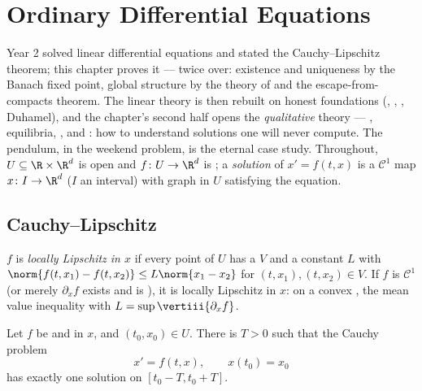 \chapter{Ordinary Differential Equations}\label{ch:b3:ode}

Year 2 solved linear differential equations and stated the
Cauchy--Lipschitz theorem; this chapter proves it --- twice
over: existence and uniqueness by the Banach fixed point,
global structure by the theory of  and the
escape-from-compacts theorem. The linear theory is then
rebuilt on honest foundations (, , , Duhamel), and the chapter's second half opens
the \emph{qualitative} theory --- , equilibria,
, and : how to
understand solutions one will never compute. The pendulum, in
the weekend problem, is the eternal case study. Throughout,
$U \subseteq \R\times\R^d$ is open and $f \colon U \to \R^d$
is ; a \emph{solution} of $x' = f(t, x)$ is a
$\mathcal C^1$ map $x \colon I \to \R^d$ ($I$ an interval)
with graph in $U$ satisfying the equation.

\section{Cauchy--Lipschitz}

\begin{definition}\label{def:b3:ode:lipschitz}
$f$ is \emph{locally Lipschitz in $x$}
if every point of $U$ has a  $V$ and a constant
$L$ with $\norm{f(t, x_1) - f(t, x_2)} \leq L\norm{x_1 -
x_2}$ for $(t, x_1), (t, x_2) \in V$. If $f$ is $\mathcal
C^1$ (or merely $\partial_xf$ exists and is ), it
is locally Lipschitz in $x$: on a  convex
, the mean value inequality with $L =
\sup\vertiii{\partial_xf}$.
\end{definition}

\begin{theorem}
\label{thm:b3:ode:cauchylipschitz}
Let $f$ be  and  in $x$, and $(t_0,
x_0) \in U$. There is $T > 0$ such that the Cauchy problem
\[
x' = f(t, x), \qquad x(t_0) = x_0
\]
has exactly one solution on $[t_0 - T, t_0 +
T]$.
\end{theorem}

